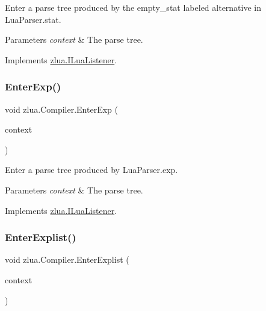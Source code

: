 Enter a parse tree produced by the {\ttfamily empty\+\_\+stat} labeled alternative in Lua\+Parser.\+stat. 


\begin{DoxyParams}{Parameters}
{\em context} & The parse tree.\\
\hline
\end{DoxyParams}


Implements \mbox{\hyperlink{interfacezlua_1_1_i_lua_listener_aaa6652e41dd59516afb02cde17c6a347}{zlua.\+I\+Lua\+Listener}}.

\mbox{\label{classzlua_1_1_compiler_a602f2e28904cb93674d854f543cff30b}} 
\subsubsection{\texorpdfstring{Enter\+Exp()}{EnterExp()}}
{\footnotesize\ttfamily void zlua.\+Compiler.\+Enter\+Exp (\begin{DoxyParamCaption}\item[{\mbox{[}\+Not\+Null\mbox{]} \mbox{\hyperlink{classzlua_1_1_lua_parser_1_1_exp_context}{Lua\+Parser.\+Exp\+Context}}}]{context }\end{DoxyParamCaption})}



Enter a parse tree produced by Lua\+Parser.\+exp. 


\begin{DoxyParams}{Parameters}
{\em context} & The parse tree.\\
\hline
\end{DoxyParams}


Implements \mbox{\hyperlink{interfacezlua_1_1_i_lua_listener_ac285772a04450f04a0552656841f1207}{zlua.\+I\+Lua\+Listener}}.

\mbox{\label{classzlua_1_1_compiler_a1ae7390644425df6bdefe1b8d7d07ceb}} 
\subsubsection{\texorpdfstring{Enter\+Explist()}{EnterExplist()}}
{\footnotesize\ttfamily void zlua.\+Compiler.\+Enter\+Explist (\begin{DoxyParamCaption}\item[{\mbox{[}\+Not\+Null\mbox{]} \mbox{\hyperlink{classzlua_1_1_lua_parser_1_1_explist_context}{Lua\+Parser.\+Explist\+Context}}}]{context }\end{DoxyParamCaption})}



